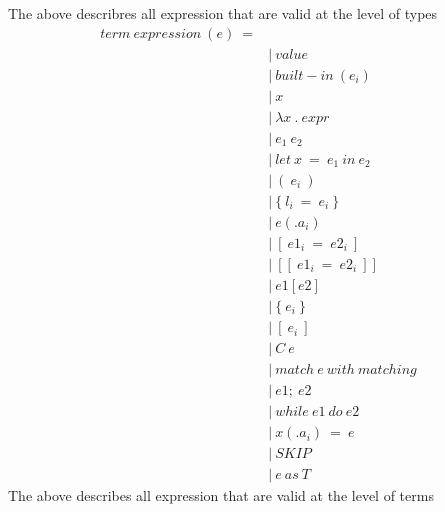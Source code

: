 \documentclass[10pt,a4paper]{article}
\begin{document}
The above describres all expression that are valid at the level of types
\newpage
\begin{align*}
term\ expression\ (e)\ = 
\\
 \ &|\ value                           \ \tag{values}
\\
 \ &|\ built-in\ (e_i)                  \ \tag{built-in\ function}
\\
 \ &|\ x                               \ \tag{variables}
\\
 \ &|\ \lambda x\ .\ expr                       \ \tag{lambda\ absctraction}
\\
 \ &|\ e_1\ e_2                         \ \tag{application}
\\
 \ &|\ let\ x\ =\ e_1\ in\ e_2              \ \tag{let\ in}
\\
 \ &|\ (\ e_i\ )                         \ \tag{tuple}
\\
 \ &|\ \{\ l_i\ =\ e_i\ \}                   \ \tag{record}
\\
 \ &|\ e(.a_i)                         \ \tag{accessor}
\\
 \ &|\ [\ e1_i\ =\ e2_i\ ]                 \ \tag{map}
\\
 \ &|\ [[\ e1_i\ =\ e2_i\ ]]               \ \tag{big\ map}
\\
 \ &|\ e1[e2]                          \ \tag{look\ up}
\\
 \ &|\ \{\ e_i\ \}                         \ \tag{set}
\\
 \ &|\ [\ e_i\ ]                         \ \tag{list}
\\
 \ &|\ C\ e                             \ \tag{constructor}
\\
 \ &|\ match\ e\ with\ matching           \ \tag{matching}
\\
 \ &|\ e1;\ e2                          \ \tag{sequence}
\\
 \ &|\ while\ e1\ do\ e2                  \ \tag{loop}
\\
 \ &|\ x(.a_i)\ =\ e                     \ \tag{assign}
\\
 \ &|\ SKIP                            \ \tag{skip}
\\
 \ &|\ e\ as\ T                          \ \tag{ascription}
\end{align*}
The above describes all expression that are valid at the level of terms
\end{document}
